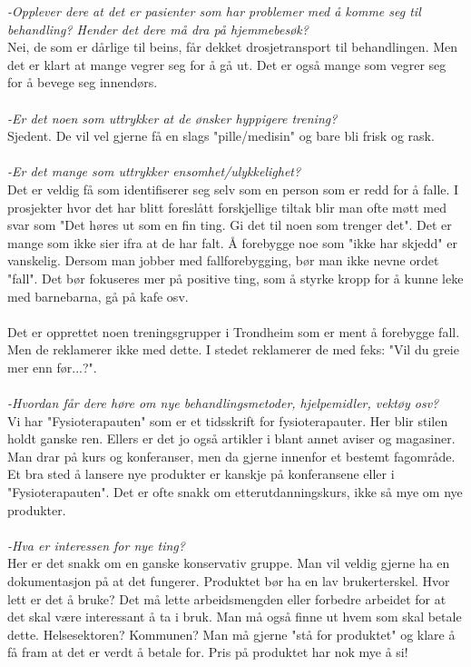 \emph{-Opplever dere at det er pasienter som har problemer med å komme seg til behandling? Hender det dere må dra på hjemmebesøk?}\\ 
Nei, de som er dårlige til beins, får dekket drosjetransport til behandlingen. Men det er klart at mange vegrer seg for å gå ut. Det er også mange som vegrer seg for å bevege seg innendørs.\\ \\
\emph{-Er det noen som uttrykker at de ønsker hyppigere trening?}\\ 
Sjedent. De vil vel gjerne få en slags "pille/medisin" og bare bli frisk og rask.\\ \\
\emph{-Er det mange som uttrykker ensomhet/ulykkelighet?}\\ 
Det er veldig få som identifiserer seg selv som en person som er redd for å falle. I prosjekter hvor det har blitt foreslått forskjellige tiltak blir man ofte møtt med svar som "Det høres ut som en fin ting. Gi det til noen som trenger det". Det er mange som ikke sier ifra at de har falt. Å forebygge noe som "ikke har skjedd" er vanskelig. Dersom man jobber med fallforebygging, bør man ikke nevne ordet "fall". Det bør fokuseres mer på positive ting, som å styrke kropp for å kunne leke med barnebarna, gå på kafe osv.\\ \\
Det er opprettet noen treningsgrupper i Trondheim som er ment å forebygge fall. Men de reklamerer ikke med dette. I stedet reklamerer de med feks: "Vil du greie mer enn før...?".\\ \\
\emph{-Hvordan får dere høre om nye behandlingsmetoder, hjelpemidler, vektøy osv?}\\ 
Vi har "Fysioterapauten" som er et tidsskrift for fysioterapauter. Her blir stilen holdt ganske ren. Ellers er det jo også artikler i blant annet aviser og magasiner. Man drar på kurs og konferanser, men da gjerne innenfor et bestemt fagområde. Et bra sted å lansere nye produkter er kanskje på konferansene eller i "Fysioterapauten". Det er ofte snakk om etterutdanningskurs, ikke så mye om nye produkter. \\ \\
\emph{-Hva er interessen for nye ting?} \\ 
Her er det snakk om en ganske konservativ gruppe. Man vil veldig gjerne ha en dokumentasjon på at det fungerer. Produktet bør ha en lav brukerterskel. Hvor lett er det å bruke? Det må lette arbeidsmengden eller forbedre arbeidet for at det skal være interessant å ta i bruk. Man må også finne ut hvem som skal betale dette. Helsesektoren? Kommunen? Man må gjerne "stå for produktet" og klare å få fram at det er verdt å betale for. Pris på produktet har nok mye å si! \\ \\
